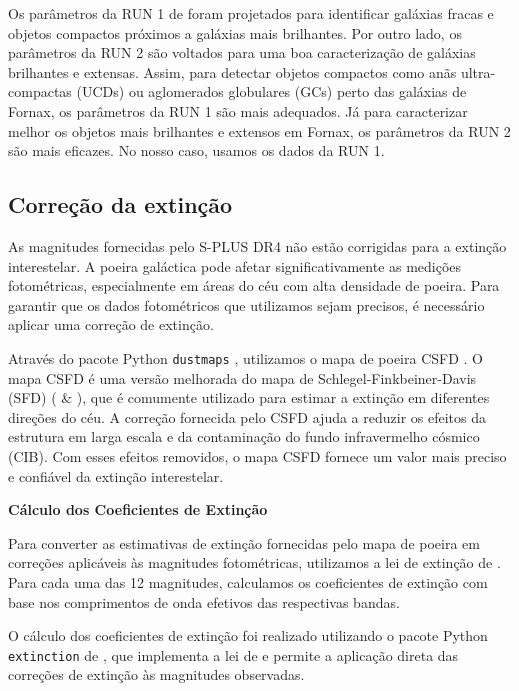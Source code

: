 Os parâmetros da RUN 1 de \cite{haack2024splusfornaxprojectsfp} foram projetados para identificar galáxias fracas e objetos compactos próximos a galáxias mais brilhantes. Por outro lado, os parâmetros da RUN 2 são voltados para uma boa caracterização de galáxias brilhantes e extensas. Assim, para detectar objetos compactos como anãs ultra-compactas (UCDs) ou aglomerados globulares (GCs) perto das galáxias de Fornax, os parâmetros da RUN 1 são mais adequados. Já para caracterizar melhor os objetos mais brilhantes e extensos em Fornax, os parâmetros da RUN 2 são mais eficazes. No nosso caso, usamos os dados da RUN 1.

\subsection{Correção da extinção}\label{sec:Coeficientes_ext}

As magnitudes fornecidas pelo S-PLUS DR4 não estão corrigidas para a extinção interestelar. A poeira galáctica pode afetar significativamente as medições fotométricas, especialmente em áreas do céu com alta densidade de poeira. Para garantir que os dados fotométricos que utilizamos sejam precisos, é necessário aplicar uma correção de extinção.

Através do pacote Python \texttt{dustmaps} \citep{dustmapsGreen2018}, utilizamos o mapa de poeira CSFD \citep{chiang2023correctedsfdaccurategalactic}. O mapa CSFD é uma versão melhorada do mapa de Schlegel-Finkbeiner-Davis (SFD) (\citealt{Schlegel_1998} \& \citealt{Schlafly_2011}), que é comumente utilizado para estimar a extinção em diferentes direções do céu. A correção fornecida pelo CSFD ajuda a reduzir os efeitos da estrutura em larga escala e da contaminação do fundo infravermelho cósmico (CIB). Com esses efeitos removidos, o mapa CSFD fornece um valor mais preciso e confiável da extinção interestelar.

\textbf{Cálculo dos Coeficientes de Extinção}

Para converter as estimativas de extinção fornecidas pelo mapa de poeira em correções aplicáveis às magnitudes fotométricas, utilizamos a lei de extinção de \cite{cardelli1989dust}. Para cada uma das 12 magnitudes, calculamos os coeficientes de extinção com base nos comprimentos de onda efetivos das respectivas bandas.

\sloppy
O cálculo dos coeficientes de extinção foi realizado utilizando o pacote Python \texttt{extinction} de \cite{barbary2017extinction}, que implementa a lei de \cite{cardelli1989dust} e permite a aplicação direta das correções de extinção às magnitudes observadas.

